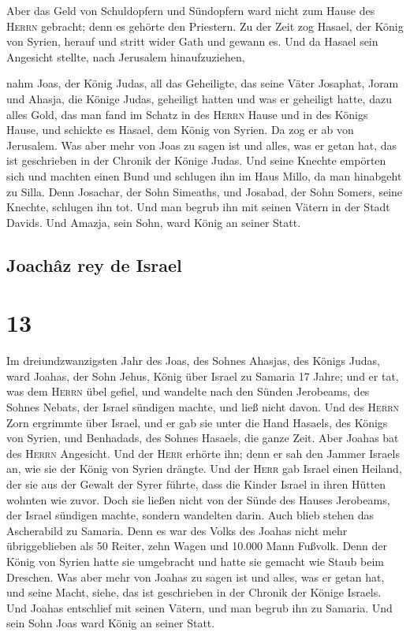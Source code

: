  Aber das Geld von Schuldopfern und Sündopfern ward nicht
zum Hause des \textsc{Herrn} gebracht; denn es gehörte den Priestern.
 Zu der Zeit zog Hasael, der König von Syrien, herauf und
stritt wider Gath und gewann es. Und da Hasael sein Angesicht stellte,
nach Jerusalem hinaufzuziehen,

 nahm Joas, der König Judas, all das Geheiligte, das
seine Väter Josaphat, Joram und Ahasja, die Könige Judas, geheiligt
hatten und was er geheiligt hatte, dazu alles Gold, das man fand im
Schatz in des \textsc{Herrn} Hause und in des Königs Hause, und schickte
es Hasael, dem König von Syrien. Da zog er ab von Jerusalem.
 Was aber mehr von Joas zu sagen ist und alles, was er
getan hat, das ist geschrieben in der Chronik der Könige Judas.
 Und seine Knechte empörten sich und machten einen Bund
und schlugen ihn im Haus Millo, da man hinabgeht zu Silla.
 Denn Josachar, der Sohn Simeaths, und Josabad, der Sohn
Somers, seine Knechte, schlugen ihn tot. Und man begrub ihn mit seinen
Vätern in der Stadt Davids. Und Amazja, sein Sohn, ward König an seiner
Statt.

\hypertarget{joachuxe2z-rey-de-israel}{%
\subsection{Joachâz rey de Israel}\label{joachuxe2z-rey-de-israel}}

\hypertarget{section-12}{%
\section{13}\label{section-12}}

 Im dreiundzwanzigsten Jahr des Joas, des Sohnes Ahasjas,
des Königs Judas, ward Joahas, der Sohn Jehus, König über Israel zu
Samaria 17 Jahre;  und er tat, was dem \textsc{Herrn} übel
gefiel, und wandelte nach den Sünden Jerobeams, des Sohnes Nebats, der
Israel sündigen machte, und ließ nicht davon.  Und des
\textsc{Herrn} Zorn ergrimmte über Israel, und er gab sie unter die Hand
Hasaels, des Königs von Syrien, und Benhadads, des Sohnes Hasaels, die
ganze Zeit.  Aber Joahas bat des \textsc{Herrn} Angesicht.
Und der \textsc{Herr} erhörte ihn; denn er sah den Jammer Israels an,
wie sie der König von Syrien drängte.  Und der
\textsc{Herr} gab Israel einen Heiland, der sie aus der Gewalt der Syrer
führte, dass die Kinder Israel in ihren Hütten wohnten wie zuvor.
 Doch sie ließen nicht von der Sünde des Hauses Jerobeams,
der Israel sündigen machte, sondern wandelten darin. Auch blieb stehen
das Ascherabild zu Samaria.  Denn es war des Volks des
Joahas nicht mehr übriggeblieben als 50 Reiter, zehn Wagen und 10.000
Mann Fußvolk. Denn der König von Syrien hatte sie umgebracht und hatte
sie gemacht wie Staub beim Dreschen.  Was aber mehr von
Joahas zu sagen ist und alles, was er getan hat, und seine Macht, siehe,
das ist geschrieben in der Chronik der Könige Israels. 
Und Joahas entschlief mit seinen Vätern, und man begrub ihn zu Samaria.
Und sein Sohn Joas ward König an seiner Statt.

